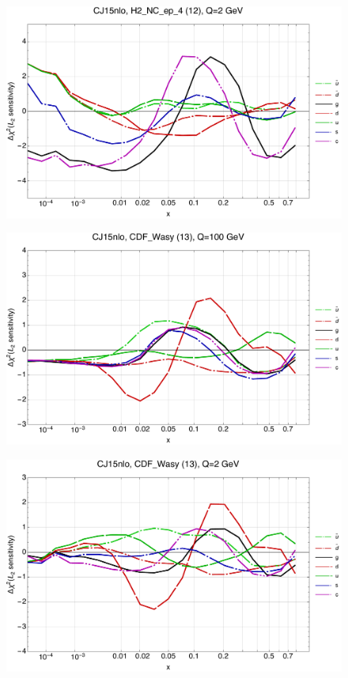 \documentclass[10pt,aps,prd,floatfix,titlepage]{revtex4}
\begin{document}
\begin{figure}
\includegraphics[width=\textwidth,height=0.44\textheight,keepaspectratio]{1/12_CJ15nlo_L2_q2_Sf_1.pdf}
\caption{}
\end{figure}
\clearpage
\begin{figure}
\includegraphics[width=\textwidth,height=0.44\textheight,keepaspectratio]{1/13_CJ15nlo_L2_q100_Sf_1.pdf}
\caption{}
\end{figure}
\begin{figure}
\includegraphics[width=\textwidth,height=0.44\textheight,keepaspectratio]{1/13_CJ15nlo_L2_q2_Sf_1.pdf}
\caption{}
\end{figure}
\end{document}
